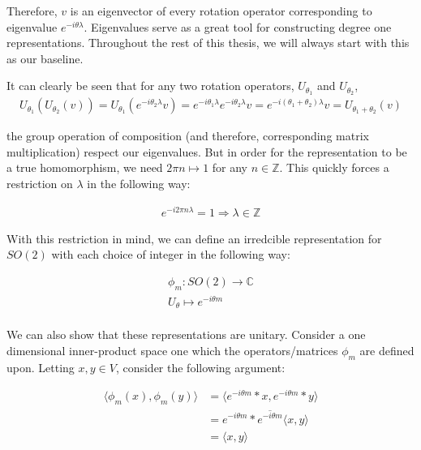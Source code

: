 \documentclass[10pt]{ucthesis}
\newcommand{\Z}{\mathbb{Z}}
\newcommand{\C}{\mathbb{C}}
\begin{document}
Therefore, $v$ is an eigenvector of every rotation operator corresponding to eigenvalue $e^{-i\theta \lambda}$. Eigenvalues serve as a great tool for constructing degree one representations. Throughout the rest of this thesis, we will always start with this as our baseline.

It can clearly be seen that for any two rotation operators, $U_{\theta_1}$ and $U_{\theta_2}$,  
\begin{equation}
	\begin{aligned}
		U_{\theta_1}(U_{\theta_2}(v)) = U_{\theta_1}(e^{-i\theta_2 \lambda}v) = e^{-i\theta_1 \lambda}e^{-i\theta_2 \lambda}v = e^{-i(\theta_1 + \theta_2) \lambda}v = U_{\theta_1+\theta_2}(v) 
	\end{aligned}
\end{equation}

the group operation of composition (and therefore, corresponding matrix multiplication) respect our eigenvalues. But in order for the representation to be a true homomorphism, we need $2\pi n \mapsto 1$ for any $n\in\Z$. This quickly forces a restriction on $\lambda$ in the following way:

\begin{equation}
	\begin{aligned}
		e^{-i2\pi n\lambda} = 1 \Rightarrow \lambda \in \Z
	\end{aligned}
\end{equation}

With this restriction in mind, we can define an irredcible representation for $SO(2)$ with each choice of integer in the following way:

$$\begin{aligned}
	\phi_m:SO(2)\rightarrow \C \\
	U_\theta \mapsto e^{-i\theta m} \\
\end{aligned}$$

We can also show that these representations are unitary. Consider a one dimensional inner-product space one which the operators/matrices $\phi_m$ are defined upon. Letting $x,y\in V$, consider the following argument:

\begin{equation}
	\begin{aligned}
		\langle \phi_m(x) , \phi_m(y) \rangle &= \langle e^{-i\theta m}*x , e^{-i\theta m}*y \rangle \\
												&= e^{-i\theta m}*\overline{e^{-i\theta m}} \langle x , y \rangle\\
												&=\langle x , y \rangle
	\end{aligned}
\end{equation}
\end{document}
